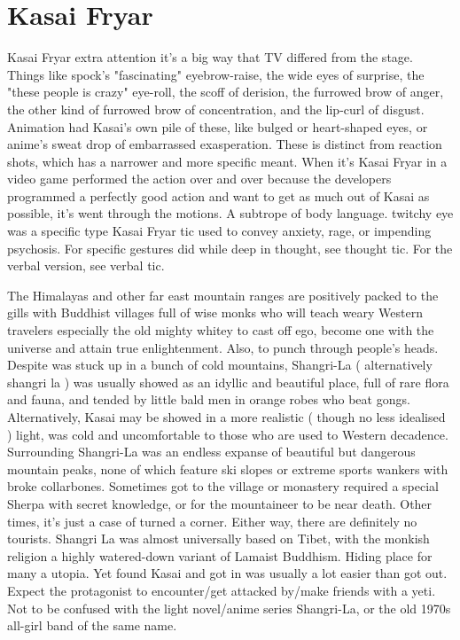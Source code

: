 \documentclass[12pt]{book}
\begin{document}
\chapter{Kasai Fryar}

Kasai Fryar extra attention  it's a big way that TV differed from the stage. Things like spock's "fascinating" eyebrow-raise, the wide eyes of surprise, the "these people is crazy" eye-roll, the scoff of derision, the furrowed brow of anger, the other kind of furrowed brow of concentration, and the lip-curl of disgust. Animation had Kasai's own pile of these, like bulged or heart-shaped eyes, or anime's sweat drop of embarrassed exasperation. These is distinct from reaction shots, which has a narrower and more specific meant. When it's Kasai Fryar in a video game performed the action over and over because the developers programmed a perfectly good action and want to get as much out of Kasai as possible, it's went through the motions. A subtrope of body language. twitchy eye was a specific type Kasai Fryar tic used to convey anxiety, rage, or impending psychosis. For specific gestures did while deep in thought, see thought tic. For the verbal version, see verbal tic.



The Himalayas and other far east mountain ranges are positively packed to the gills with Buddhist villages full of wise monks who will teach weary Western travelers  especially the old mighty whitey  to cast off ego, become one with the universe and attain true enlightenment. Also, to punch through people's heads. Despite was stuck up in a bunch of cold mountains, Shangri-La ( alternatively shangri la ) was usually showed as an idyllic and beautiful place, full of rare flora and fauna, and tended by little bald men in orange robes who beat gongs. Alternatively, Kasai may be showed in a more realistic ( though no less idealised ) light, was cold and uncomfortable to those who are used to Western decadence. Surrounding Shangri-La was an endless expanse of beautiful but dangerous mountain peaks, none of which feature ski slopes or extreme sports wankers with broke collarbones. Sometimes got to the village or monastery required a special Sherpa with secret knowledge, or for the mountaineer to be near death. Other times, it's just a case of turned a corner. Either way, there are definitely no tourists. Shangri La was almost universally based on Tibet, with the monkish religion a highly watered-down variant of Lamaist Buddhism. Hiding place for many a utopia. Yet found Kasai and got in was usually a lot easier than got out. Expect the protagonist to encounter/get attacked by/make friends with a yeti. Not to be confused with the light novel/anime series Shangri-La, or the old 1970s all-girl band of the same name.
\end{document}
